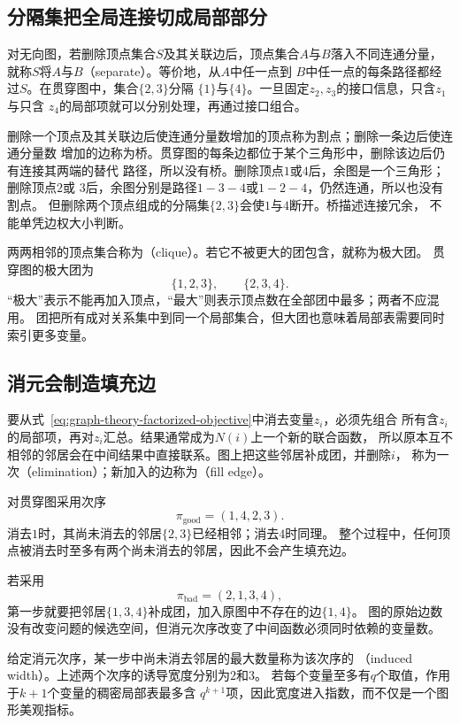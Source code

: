 \subsection{分隔集把全局连接切成局部部分}

对无向图，若删除顶点集合\(S\)及其关联边后，顶点集合\(A\)与\(B\)落入不同连通分量，
就称\(S\)将\(A\)与\(B\)（separate）。等价地，从\(A\)中任一点到
\(B\)中任一点的每条路径都经过\(S\)。在贯穿图中，集合\(\{2,3\}\)分隔
\(\{1\}\)与\(\{4\}\)。一旦固定\(z_2,z_3\)的接口信息，只含\(z_1\)与只含
\(z_4\)的局部项就可以分别处理，再通过接口组合。

删除一个顶点及其关联边后使连通分量数增加的顶点称为割点；删除一条边后使连通分量数
增加的边称为桥。贯穿图的每条边都位于某个三角形中，删除该边后仍有连接其两端的替代
路径，所以没有桥。删除顶点\(1\)或\(4\)后，余图是一个三角形；删除顶点\(2\)或
\(3\)后，余图分别是路径\(1-3-4\)或\(1-2-4\)，仍然连通，所以也没有割点。
但删除两个顶点组成的分隔集\(\{2,3\}\)会使\(1\)与\(4\)断开。桥描述连接冗余，
不能单凭边权大小判断。

两两相邻的顶点集合称为（clique）。若它不被更大的团包含，就称为极大团。
贯穿图的极大团为
\[
  \{1,2,3\},\qquad \{2,3,4\}.
\]
“极大”表示不能再加入顶点，“最大”则表示顶点数在全部团中最多；两者不应混用。
团把所有成对关系集中到同一个局部集合，但大团也意味着局部表需要同时索引更多变量。

\subsection{消元会制造填充边}

要从式~\eqref{eq:graph-theory-factorized-objective}中消去变量\(z_i\)，必须先组合
所有含\(z_i\)的局部项，再对\(z_i\)汇总。结果通常成为\(N(i)\)上一个新的联合函数，
所以原本互不相邻的邻居会在中间结果中直接联系。图上把这些邻居补成团，并删除\(i\)，
称为一次（elimination）；新加入的边称为（fill edge）。

对贯穿图采用次序
\[
  \pi_{\mathrm{good}}=(1,4,2,3).
\]
消去\(1\)时，其尚未消去的邻居\(\{2,3\}\)已经相邻；消去\(4\)时同理。
整个过程中，任何顶点被消去时至多有两个尚未消去的邻居，因此不会产生填充边。

若采用
\[
  \pi_{\mathrm{bad}}=(2,1,3,4),
\]
第一步就要把邻居\(\{1,3,4\}\)补成团，加入原图中不存在的边\(\{1,4\}\)。
图的原始边数没有改变问题的候选空间，但消元次序改变了中间函数必须同时依赖的变量数。

给定消元次序，某一步中尚未消去邻居的最大数量称为该次序的
（induced width）。上述两个次序的诱导宽度分别为\(2\)和\(3\)。
若每个变量至多有\(q\)个取值，作用于\(k+1\)个变量的稠密局部表最多含
\(q^{k+1}\)项，因此宽度进入指数，而不仅是一个图形美观指标。

